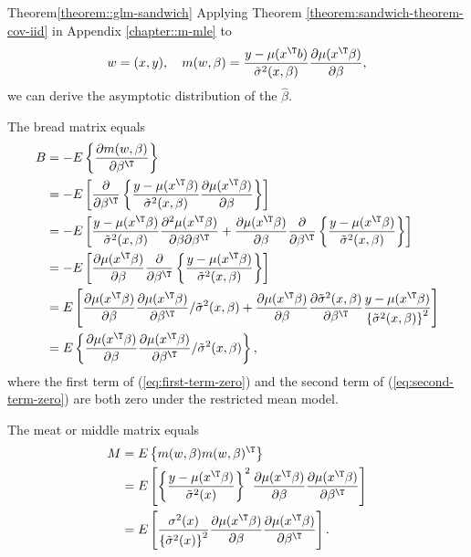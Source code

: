  
 \begin{myproof}{Theorem}{\ref{theorem::glm-sandwich}}
 Applying Theorem \ref{theorem:sandwich-theorem-cov-iid} in Appendix \ref{chapter::m-mle} to 
\[
w=(x,y),\quad m(w,\beta)=\frac{y-\mu(x^{\T} b)}{\tilde{\sigma}^{2}(x, \beta)}\frac{\partial\mu(x^{\T} \beta)}{\partial \beta },
\]
we can derive the asymptotic distribution of the $\hat{\beta}$. 

The bread matrix equals
\begin{align}
B & =-E\left\{ \frac{\partial m(w,\beta)}{\partial\beta^{\T}}\right\} \nonumber \\
 & =-E\left[\frac{\partial}{\partial\beta^{\T}}\left\{ \frac{y-\mu(x^{\T}\beta)}{\tilde{\sigma}^{2}(x,\beta)}\frac{\partial\mu(x^{\T}\beta)}{\partial\beta}\right\} \right]\nonumber \\
 & =-E\left[\frac{y-\mu(x^{\T}\beta)}{\tilde{\sigma}^{2}(x,\beta)}\frac{\partial^{2}\mu(x^{\T}\beta)}{\partial\beta\partial\beta^{\T}}+\frac{\partial\mu(x^{\T}\beta)}{\partial\beta}\frac{\partial}{\partial\beta^{\T}}\left\{ \frac{y-\mu(x^{\T}\beta)}{\tilde{\sigma}^{2}(x,\beta)}\right\} \right]\label{eq:first-term-zero}\\
 & =-E\left[\frac{\partial\mu(x^{\T}\beta)}{\partial\beta}\frac{\partial}{\partial\beta^{\T}}\left\{ \frac{y-\mu(x^{\T}\beta)}{\tilde{\sigma}^{2}(x,\beta)}\right\} \right]\nonumber \\
 & =E\left[\frac{\partial\mu(x^{\T}\beta)}{\partial\beta}\frac{\partial\mu(x^{\T}\beta)}{\partial\beta^{\T}}/\tilde{\sigma}^{2}(x,\beta)+\frac{\partial\mu(x^{\T}\beta)}{\partial\beta}\frac{\partial\tilde{\sigma}^{2}(x,\beta)}{\partial\beta^{\T}}\frac{y-\mu(x^{\T}\beta)}{\left\{ \tilde{\sigma}^{2}(x,\beta)\right\} ^{2}}\right]\label{eq:second-term-zero}\\
 & =E\left\{ \frac{\partial\mu(x^{\T}\beta)}{\partial\beta}\frac{\partial\mu(x^{\T}\beta)}{\partial\beta^{\T}}/\tilde{\sigma}^{2}(x,\beta)\right\} ,\nonumber 
\end{align}
where the first term of (\ref{eq:first-term-zero}) and the second
term of (\ref{eq:second-term-zero}) are both zero under the restricted
mean model. 

The meat or middle matrix equals
\begin{align*}
M & =E\left\{ m(w,\beta)m(w,\beta)^{\T}\right\} \\
 & =E\left[\left\{ \frac{y-\mu(x^{\T}\beta)}{\tilde{\sigma}^{2}(x)}\right\} ^{2}\frac{\partial\mu(x^{\T}\beta)}{\partial\beta}\frac{\partial\mu(x^{\T}\beta)}{\partial\beta^{\T}}\right]\\
 & =E\left[\frac{\sigma^{2}(x)}{\left\{ \tilde{\sigma}^{2}(x)\right\} ^{2}}\frac{\partial\mu(x^{\T}\beta)}{\partial\beta}\frac{\partial\mu(x^{\T}\beta)}{\partial\beta^{\T}}\right].
\end{align*}
 \end{myproof}
 
